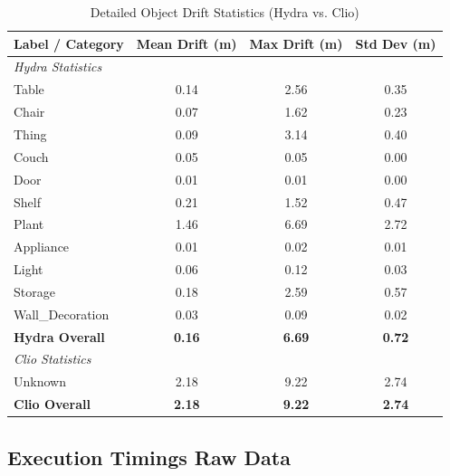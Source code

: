 \begin{table}[H]
\centering
\caption{Detailed Object Drift Statistics (Hydra vs. Clio)}
\label{tab:object_drift_breakdown}
\begin{tabular}{l ccc}
\toprule
\textbf{Label / Category} & \textbf{Mean Drift (m)} & \textbf{Max Drift (m)} & \textbf{Std Dev (m)} \\ \midrule
\textit{Hydra Statistics} & & & \\
Table & 0.14 & 2.56 & 0.35 \\
Chair & 0.07 & 1.62 & 0.23 \\
Thing & 0.09 & 3.14 & 0.40 \\
Couch & 0.05 & 0.05 & 0.00 \\
Door & 0.01 & 0.01 & 0.00 \\
Shelf & 0.21 & 1.52 & 0.47 \\
Plant & 1.46 & 6.69 & 2.72 \\
Appliance & 0.01 & 0.02 & 0.01 \\
Light & 0.06 & 0.12 & 0.03 \\
Storage & 0.18 & 2.59 & 0.57 \\
Wall\_Decoration & 0.03 & 0.09 & 0.02 \\ \midrule
\textbf{Hydra Overall} & \textbf{0.16} & \textbf{6.69} & \textbf{0.72} \\ \midrule
\textit{Clio Statistics} & & & \\
Unknown & 2.18 & 9.22 & 2.74 \\ \midrule
\textbf{Clio Overall} & \textbf{2.18} & \textbf{9.22} & \textbf{2.74} \\ \bottomrule
\end{tabular}
\end{table}


\subsection{Execution Timings Raw Data}\label{app:timings}

